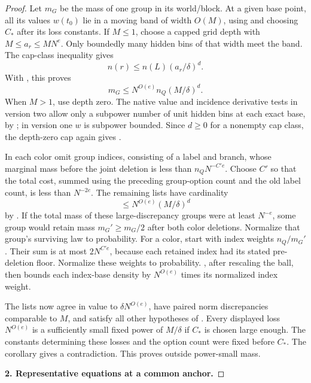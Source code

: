 \begin{proof}
Let \(m_G\) be the mass of one group in its world/block.
At a given base point, all its values \(w(t_0)\) lie in a
moving band of width \(O(M)\), using
 and choosing \(C_*\) after its
loss constants.  If \(M\le1\), choose a capped grid depth
with \(M\le a_r\le MN^e\).  Only boundedly many hidden bins
of that width meet the band.  The cap-class inequality gives
\[
 n(r)\le n(L)(a_r/\delta)^d.
\]
With , this proves
\begin{equation}
 m_G\le N^{O(e)}n_Q(M/\delta)^d.
 \label{a02:matching-group-mass}
\end{equation}
When \(M>1\), use depth zero.  The native value and incidence
derivative tests in version two allow only a subpower number of
unit hidden bins at each exact base, by
; in version one \(w\)
is subpower bounded.  Since \(d\ge0\) for a nonempty cap
class, the depth-zero cap again gives
.

In each color omit group indices, consisting of a label and
branch, whose marginal mass before the joint deletion is
less than \(n_QN^{-C'e}\).  Choose \(C'\) so that the total
cost, summed using the preceding group-option count and
the old label count, is less than \(N^{-2e}\).
The remaining lists have cardinality
\[
 \le N^{O(e)}(M/\delta)^d
\]
by .
If the total mass of these large-discrepancy groups were at
least \(N^{-e}\), some group would retain mass
\(m_G'\ge m_G/2\) after both color deletions.
Normalize that group's surviving law to probability.
For a color, start with index weights \(n_Q/m_G'\).
Their sum is at most \(2N^{C'e}\), because each retained
index had its stated pre-deletion floor.  Normalize these
weights to probability.  , after rescaling the ball,
then bounds each index-base density by \(N^{O(e)}\) times
its normalized index weight.

The lists now agree in value to \(\delta N^{O(e)}\), have
paired norm discrepancies comparable to \(M\), and satisfy
all other hypotheses of .
Every displayed loss \(N^{O(e)}\) is a sufficiently small
fixed power of \(M/\delta\) if \(C_*\) is chosen large enough.
The constants determining these losses and the option count
were fixed before \(C_*\).  The corollary gives a
contradiction.  This proves 
outside power-small mass.

\par\medskip\noindent\textbf{2. Representative equations at a common anchor.}


\end{proof}

